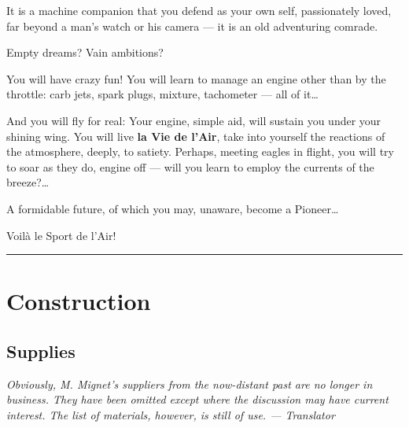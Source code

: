\documentclass{book}
\newcommand*\sectline{
  \vspace{5pt}
  \begin{center}
    \rule{0.5\linewidth}{\linethickness}
  \end{center}
  \vspace{5pt}
}
\begin{document}
It is a machine companion that you defend as your own self,
passionately loved, far beyond a man's watch or his camera --- it is
an old adventuring comrade.

Empty dreams?  Vain ambitions?

You will have crazy fun! You will learn to manage an engine other than
by the throttle: carb jets, spark plugs, mixture, tachometer --- all
of it\ldots

And you will fly for real: Your engine, simple aid, will sustain you
under your shining wing. You will live \textbf{la Vie de l'Air}, take
into yourself the reactions of the atmosphere, deeply, to satiety.
Perhaps, meeting eagles in flight, you will try to soar as they do,
engine off --- will you learn to employ the currents of the
breeze?\ldots

A formidable future, of which you may, unaware, become a Pioneer\ldots

{
  \selectfont
  \begin{center}
    {\Huge Voil\`a le Sport de l'Air!}
  \end{center}
}

\sectline

\chapter{Construction}

\section{Supplies}

\textit{Obviously, M. Mignet's suppliers from the
  now-distant past are no longer in business.  They have been omitted
  except where the discussion may have current interest.  The list of
  materials, however, is still of use. --- Translator}
\end{document}
